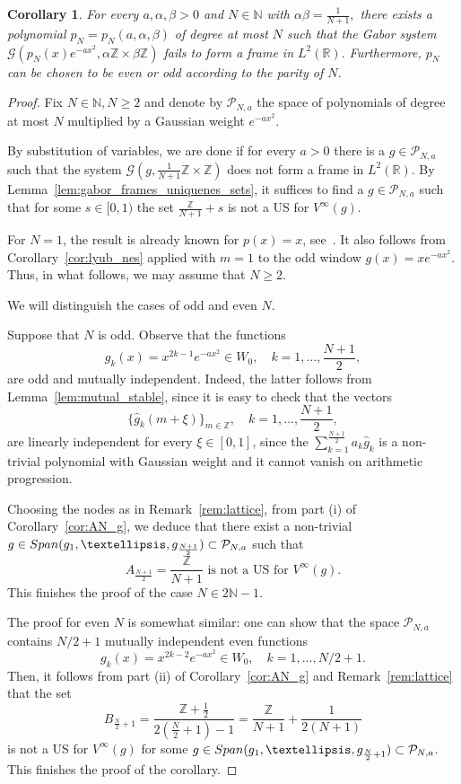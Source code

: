 \documentclass[10pt,a4paper]{amsart}
\numberwithin{equation}{section}
\newtheorem{corollary}[theorem]{Corollary} \newcommand{\La}{\Lambda}
\newcommand{\R}{{\mathbb R}} \newcommand{\Q}{{\mathbb Q}} \newcommand{\Z}{{\mathbb Z}} \newcommand{\N}{{\mathbb N}}
\begin{document}
\begin{corollary}\label{cor:sharp_hermite}
For every $a,\alpha, \beta>0$ and $N\in \N$ with $ \alpha \beta = \frac{1}{N+1},$ there exists a polynomial $p_N=p_N(a,\alpha,\beta)$ of degree at most $N$ such that the Gabor system $\mathcal{G}(p_N(x)e^{-ax^2}, \alpha\Z \times \beta\Z)$
 fails to form a frame in $ L^2(\R).$ Furthermore, $p_N$ can be chosen to be even or odd according to the parity of $N$.
\end{corollary}
\begin{proof}
Fix $N\in \N, N \geq 2$ and denote by $\mathcal{P}_{N,a}$ the space of polynomials of degree at most $N$ multiplied by a Gaussian weight $e^{-ax^2}$.

    By substitution of variables, we are done if for every $a>0$ there is a $g\in\mathcal{P}_{N,a}$
    such that the system $\mathcal{G}(g, \frac{1}{N+1}\Z \times \Z)$ does not form a frame in $L^2(\R)$. By Lemma~\ref{lem:gabor_frames_uniquenes_sets}, it suffices to find a $g \in \mathcal{P}_{N,a}$ such that for some $s\in[0,1)$ the set $\frac{\Z}{N+1} + s$ is not a US for $V^{\infty}(g)$.

For $N=1$, the result is already known for $p(x)=x$, see~\cite{MR3027914}.
It also follows from Corollary~\ref{cor:lyub_nes} applied with $m=1$ to the odd window
$g(x)=xe^{-ax^2}$. Thus, in what
follows, we may assume that $N\geq 2$.

We will distinguish the cases of odd and even $N$.
    
    Suppose that $N$ is odd.
    Observe that the functions
    $$
    g_k(x) = x^{2k-1} e^{-ax^2} \in W_0, \quad k=1,\dots,\frac{N+1}{2},
    $$
    are odd and mutually independent. Indeed, the latter follows from Lemma~\ref{lem:mutual_stable}, since it is easy to check that the vectors
    $$ \{\hat g_k(m+\xi)\}_{m \in \Z}, \quad k=1,\dots, \frac{N+1}{2},$$ are linearly independent for every $\xi \in[0,1]$, since the $\sum_{k=1}^\frac{N+1}{2} a_k \hat g_k$ is a non-trivial polynomial with Gaussian weight and it cannot vanish on arithmetic progression.
    
    Choosing the nodes as in Remark~\ref{rem:lattice}, from part (i) of Corollary~\ref{cor:AN_g}, we deduce that there exist a non-trivial $g\in {\rm Span} (g_1,\dots, g_{\frac{N+1}{2}}) \subset \mathcal{P}_{N,a}$ such that $$A_{\frac{N+1}{2}} = \frac{\Z}{N+1} \text{ is not a US for } V^{\infty}(g).$$ This finishes the proof of the case $N\in 2\N-1.$

    The proof for even $N$ is somewhat similar: one can show that the space $\mathcal{P}_{N,a}$ contains $N/2 + 1$ mutually independent even functions
    $$
    g_k(x) = x^{2k-2} e^{-ax^2} \in W_0, \quad k=1,\dots, N/2+1.
    $$ 
    Then, it follows from part (ii) of Corollary~\ref{cor:AN_g} and Remark~\ref{rem:lattice} that the set $$B_{\frac{N}{2}+1}=\frac{\Z + \frac{1}{2}}{2(\frac{N}{2}+1) - 1} = \frac{\Z }{N+1} + \frac{1}{2(N+1)}$$ is not a US for $V^{\infty}(g)$ for some $g \in {\rm Span} (g_1, \dots, g_{\frac{N}{2}+1}) \subset \mathcal{P}_{N,a}$. This finishes the proof of the corollary.
\end{proof}
\end{document}
